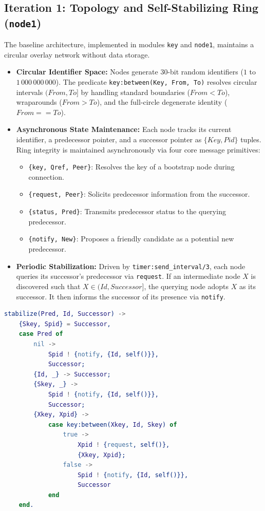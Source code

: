 \documentclass[a4paper, 11pt]{article}
\begin{document}
\subsection{Iteration 1: Topology and Self-Stabilizing Ring (\texttt{node1})}
The baseline architecture, implemented in modules \texttt{key} and \texttt{node1}, maintains a circular overlay network without data storage.
\begin{itemize}
    \item \textbf{Circular Identifier Space:} Nodes generate 30-bit random identifiers ($1$ to $1\,000\,000\,000$). The predicate \texttt{key:between(Key, From, To)} resolves circular intervals $(From, To]$ by handling standard boundaries ($From < To$), wraparounds ($From > To$), and the full-circle degenerate identity ($From == To$).
    \item \textbf{Asynchronous State Maintenance:} Each node tracks its current identifier, a predecessor pointer, and a successor pointer as $\{Key, Pid\}$ tuples. Ring integrity is maintained asynchronously via four core message primitives:
    \begin{itemize}
        \item \texttt{\{key, Qref, Peer\}}: Resolves the key of a bootstrap node during connection.
        \item \texttt{\{request, Peer\}}: Solicits predecessor information from the successor.
        \item \texttt{\{status, Pred\}}: Transmits predecessor status to the querying predecessor.
        \item \texttt{\{notify, New\}}: Proposes a friendly candidate as a potential new predecessor.
    \end{itemize}
    \item \textbf{Periodic Stabilization:} Driven by \texttt{timer:send\_interval/3}, each node queries its successor's predecessor via \texttt{request}. If an intermediate node $X$ is discovered such that $X \in (Id, Successor]$, the querying node adopts $X$ as its successor. It then informs the successor of its presence via \texttt{notify}.
\end{itemize}

\begin{lstlisting}[language=erlang]
stabilize(Pred, Id, Successor) ->
    {Skey, Spid} = Successor,
    case Pred of
        nil ->
            Spid ! {notify, {Id, self()}},
            Successor;
        {Id, _} -> Successor;
        {Skey, _} ->
            Spid ! {notify, {Id, self()}},
            Successor;
        {Xkey, Xpid} ->
            case key:between(Xkey, Id, Skey) of
                true ->
                    Xpid ! {request, self()},
                    {Xkey, Xpid};
                false ->
                    Spid ! {notify, {Id, self()}},
                    Successor
            end
    end.
\end{lstlisting}
\end{document}

